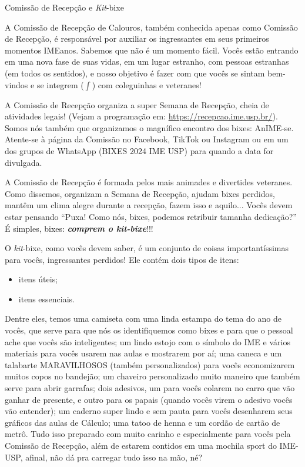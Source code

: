 \begin{secao}{Comissão de Recepção e \textit{Kit}-bixe}

A Comissão de Recepção de Calouros, também conhecida apenas como Comissão de
Recepção, é responsável por auxiliar os ingressantes em seus primeiros momentos
IMEanos. Sabemos que não é um momento fácil. Vocês estão entrando em uma nova fase
de suas vidas, em um lugar estranho, com pessoas estranhas (em todos os sentidos),
e nosso objetivo é fazer com que vocês se sintam bem-vindos e se integrem
($\int$) com coleguinhas e veteranes!

A Comissão de Recepção organiza a super Semana de Recepção, cheia de atividades
legais! (Vejam a programação em: \url{https://recepcao.ime.usp.br/}).
Somos nós também que organizamos o magnífico encontro dos bixes: AnIME-se.
Atente-se à página da Comissão no Facebook, TikTok ou Instagram ou em um dos
grupos de WhatsApp (BIXES 2024 IME USP) para quando a data for divulgada. %

A Comissão de Recepção é formada pelos mais animades e divertides veteranes. Como
dissemos, organizam a Semana de Recepção, ajudam bixes perdidos, mantêm um clima
alegre durante a recepção, fazem isso e aquilo...
Vocês devem estar pensando ``Puxa! Como nós, bixes, podemos retribuir
tamanha dedicação?'' É simples, bixes: {\bf\em comprem o \textit{kit}-bixe}!!!

O \textit{kit}-bixe, como vocês devem saber, é um conjunto de coisas
importantíssimas para vocês, ingressantes perdidos! Ele contém dois tipos de
itens:
\begin{itemize}
\item itens úteis;
\item itens essenciais.
\end{itemize} %
Dentre eles, temos uma camiseta com uma linda estampa do tema do ano de vocês,
que serve para que nós os identifiquemos como bixes e para que o pessoal
ache que vocês são inteligentes; um lindo estojo com o símbolo do IME e vários 
materiais para vocês usarem nas aulas e mostrarem por aí; uma caneca e 
um talabarte MARAVILHOSOS (também personalizados) para vocês economizarem muitos 
copos no bandejão; um chaveiro personalizado muito maneiro que também serve para 
abrir garrafas; dois adesivos, um para vocês colarem no carro que vão ganhar de 
presente, e outro para os papais (quando vocês virem o adesivo vocês vão entender); 
um caderno super lindo e sem pauta para vocês desenharem seus gráficos das aulas 
de Cálculo; uma tatoo de henna e um cordão de cartão de metrô. 
Tudo isso preparado com muito carinho e especialmente para vocês pela 
Comissão de Recepção, além de estarem contidos em uma mochila sport do IME-USP, 
afinal, não dá pra carregar tudo isso na mão, né?


\end{secao}
